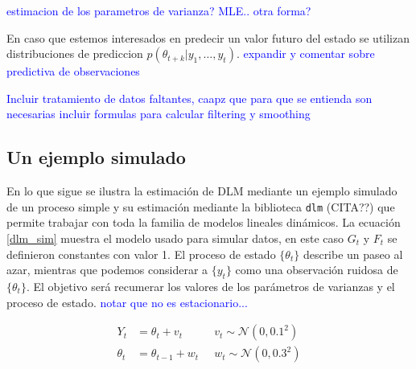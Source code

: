 \documentclass[12pt]{article}\usepackage[]{graphicx}\usepackage[]{color}
\begin{document}
\textcolor{blue}{estimacion de los parametros de varianza? MLE.. otra forma?}

En caso que estemos interesados en predecir un valor futuro del estado se utilizan distribuciones de prediccion $p(\theta_{t+k} | y_1, \ldots, y_t)$. \textcolor{blue}{expandir y comentar sobre predictiva de observaciones}

\textcolor{blue}{Incluir tratamiento de datos faltantes, caapz que para que se entienda son necesarias incluir formulas para calcular filtering y smoothing}


\subsection{Un ejemplo simulado \label{implementacionR} }
En lo que sigue se ilustra la estimación de DLM mediante un ejemplo simulado de un proceso simple y su estimación mediante la biblioteca \verb|dlm| (CITA??) que permite trabajar con toda la familia de modelos lineales dinámicos. La ecuación \eqref{dlm_sim} muestra el modelo usado para simular datos,  en este caso $G_t$ y $F_t$ se definieron constantes con valor 1. El proceso de estado $\{\theta_t\}$ describe un paseo al azar, mientras que podemos considerar a $\{y_t\}$ como una observación ruidosa de $\{\theta_t\}$. El objetivo será recumerar los valores de los parámetros de varianzas y el proceso de estado. \textcolor{blue}{notar que no es estacionario...}

\begin{equation}
\begin{aligned}
Y_t&=\theta_t + v_t  \;&\;  v_t \sim \mathcal{N}(0,0.1^2) \\
\theta_t &= \theta_{t-1} + w_t \;&\; w_t \sim \mathcal{N}(0,0.3^2)
\end{aligned}
\label{dlm_sim}
\end{equation}
\end{document}
